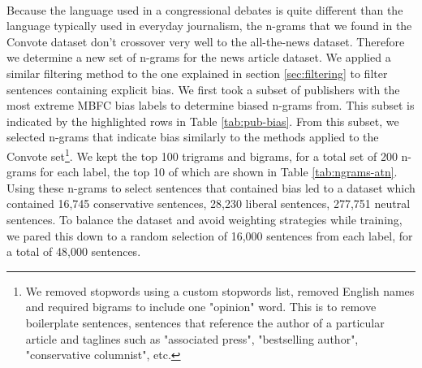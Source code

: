 \documentclass[10pt,a4paper,onecolumn]{article}
\begin{document}
\paragraph{}
Because the language used in a congressional debates is quite different than the language typically used in everyday journalism, the n-grams that we found in the Convote dataset don't crossover very well to the all-the-news dataset. Therefore we determine a new set of n-grams for the news article dataset. We applied a similar filtering method to the one explained in section \ref{sec:filtering} to filter sentences containing explicit bias. We first took a subset of publishers with the most extreme MBFC bias labels to determine biased n-grams from. This subset is indicated by the highlighted rows in Table \ref{tab:pub-bias}. From this subset, we selected n-grams that indicate bias similarly to the methods applied to the Convote set\footnote{We removed stopwords using a custom stopwords list, removed English names and required bigrams to include one "opinion" word. This is to remove boilerplate sentences, sentences that reference the author of a particular article and taglines such as "associated press", "bestselling author", "conservative columnist", etc.}. We kept the top 100 trigrams and bigrams, for a total set of 200 n-grams for each label, the top 10 of which are shown in Table \ref{tab:ngrams-atn}. Using these n-grams to select sentences that contained bias led to a dataset which contained 16,745 conservative sentences, 28,230 liberal sentences, 277,751 neutral sentences. To balance the dataset and avoid weighting strategies while training, we pared this down to a random selection of 16,000 sentences from each label, for a total of 48,000 sentences. 
\end{document}
